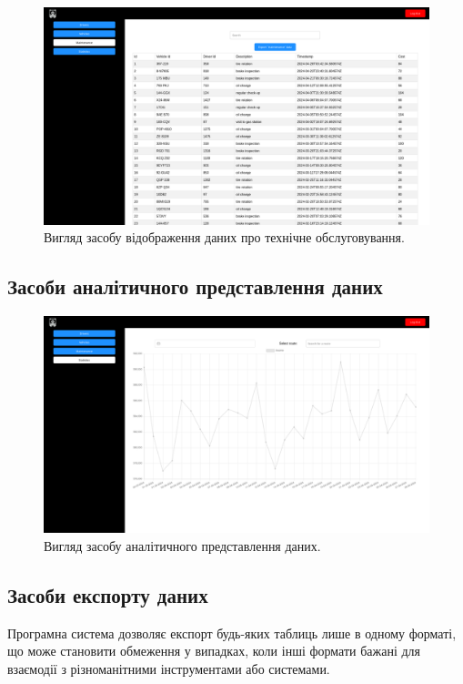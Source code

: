 \documentclass[oneside,14pt]{extarticle}
\begin{document}
\begin{figure}[H]
	\centering
	\includegraphics[scale=0.3]{8}
	\caption{Вигляд засобу відображення даних про технічне обслуговування.}
\end{figure}

\subsection{Засоби аналітичного представлення даних}

\begin{figure}[H]
	\centering
	\includegraphics[scale=0.3]{10}
	\caption{Вигляд засобу аналітичного представлення даних.}
\end{figure}

\subsection{Засоби експорту даних}
Програмна система дозволяє експорт будь-яких таблиць лише в одному форматі, що може становити обмеження у випадках, коли інші формати бажані для взаємодії з різноманітними інструментами або системами.
\end{document}
